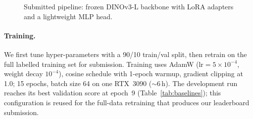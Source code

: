 \documentclass[10pt,a4paper]{article}
\begin{document}
\begin{figure}[h]
\centering
{}
\caption{Submitted pipeline: frozen DINOv3-L backbone with LoRA adapters and a lightweight MLP head.}
\label{fig:arch}
\end{figure}

\paragraph{Training.}
We first tune hyper-parameters with a 90/10 train/val split, then retrain on the full labelled training set for submission.
Training uses AdamW ($\mathrm{lr}{=}5{\times}10^{-4}$, weight decay $10^{-4}$), cosine schedule with 1-epoch warmup, gradient clipping at 1.0; 15 epochs, batch size 64 on one RTX~3090 ($\sim$6\,h).
The development run reaches its best validation score at epoch~9 (Table~\ref{tab:baselines}); this configuration is reused for the full-data retraining that produces our leaderboard submission.
\end{document}
